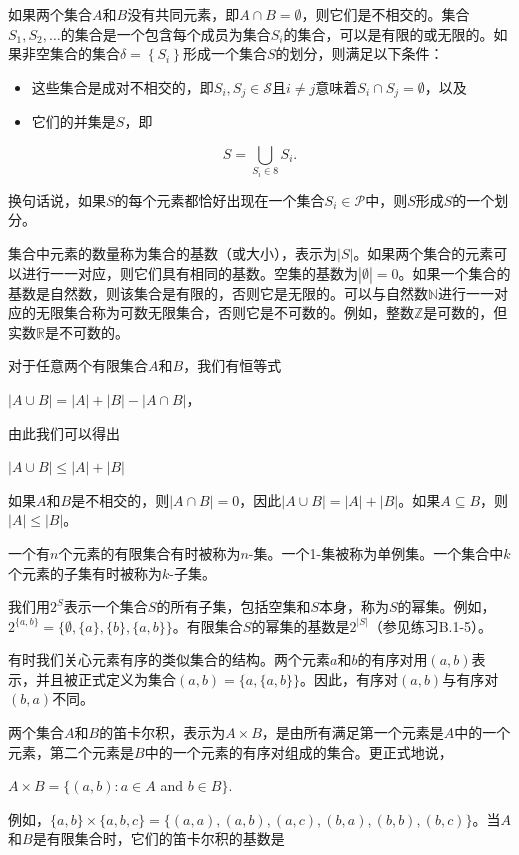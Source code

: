 \documentclass[lang=cn,newtx,10pt,scheme=chinese]{elegantbook}
\begin{document}
如果两个集合$A$和$B$没有共同元素，即$A \cap B=\emptyset$，则它们是不相交的。集合$S_1, S_2, \ldots$的集合是一个包含每个成员为集合$S_i$的集合，可以是有限的或无限的。如果非空集合的集合$\delta=\left\{S_i\right\}$形成一个集合$S$的划分，则满足以下条件：

\begin{itemize}
\item 这些集合是成对不相交的，即$S_i, S_j \in \mathcal{S}$且$i \neq j$意味着$S_i \cap S_j=\emptyset$，以及
\item 它们的并集是$S$，即
\end{itemize}

$$
S=\bigcup_{S_i \in 8} S_i .
$$

换句话说，如果$S$的每个元素都恰好出现在一个集合$S_i \in \mathcal{P}$中，则$S$形成$S$的一个划分。

集合中元素的数量称为集合的基数（或大小），表示为$|S|$。如果两个集合的元素可以进行一一对应，则它们具有相同的基数。空集的基数为$|\emptyset|=0$。如果一个集合的基数是自然数，则该集合是有限的，否则它是无限的。可以与自然数$\mathbb{N}$进行一一对应的无限集合称为可数无限集合，否则它是不可数的。例如，整数$\mathbb{Z}$是可数的，但实数$\mathbb{R}$是不可数的。

对于任意两个有限集合$A$和$B$，我们有恒等式

$|A \cup B|=|A|+|B|-|A \cap B|$，

由此我们可以得出

$|A \cup B| \leq|A|+|B|$

如果$A$和$B$是不相交的，则$|A \cap B|=0$，因此$|A \cup B|=|A|+|B|$。如果$A \subseteq B$，则$|A| \leq|B|$。

一个有$n$个元素的有限集合有时被称为$n$-集。一个1-集被称为单例集。一个集合中$k$个元素的子集有时被称为$k$-子集。

我们用$2^S$表示一个集合$S$的所有子集，包括空集和$S$本身，称为$S$的幂集。例如，$2^{\{a, b\}}=\{\emptyset,\{a\},\{b\},\{a, b\}\}$。有限集合$S$的幂集的基数是$2^{|S|}$（参见练习B.1-5）。

有时我们关心元素有序的类似集合的结构。两个元素$a$和$b$的有序对用$(a, b)$表示，并且被正式定义为集合$(a, b)=\{a,\{a, b\}\}$。因此，有序对$(a, b)$与有序对$(b, a)$不同。

两个集合$A$和$B$的笛卡尔积，表示为$A \times B$，是由所有满足第一个元素是$A$中的一个元素，第二个元素是$B$中的一个元素的有序对组成的集合。更正式地说，

$A \times B=\{(a, b): a \in A$ and $b \in B\}$.

例如，$\{a, b\} \times\{a, b, c\}=\{(a, a),(a, b),(a, c),(b, a),(b, b),(b, c)\}$。当$A$和$B$是有限集合时，它们的笛卡尔积的基数是
\end{document}
